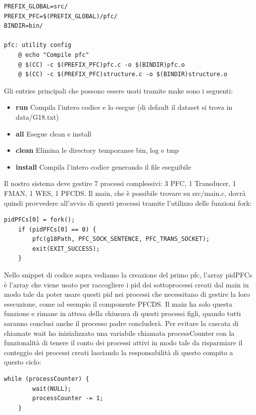 \documentclass{article}
\begin{document}
\begin{flushleft}
\begin{lstlisting}[frame=single]
PREFIX_GLOBAL=src/
PREFIX_PFC=$(PREFIX_GLOBAL)/pfc/
BINDIR=bin/

pfc: utility config 
	@ echo "Compile pfc"
	@ $(CC) -c $(PREFIX_PFC)pfc.c -o $(BINDIR)pfc.o
	@ $(CC) -c $(PREFIX_PFC)structure.c -o $(BINDIR)structure.o
\end{lstlisting}

Gli entries principali che possono essere usati tramite make sono i seguenti:

\begin{itemize}
    \item \textbf{run} Compila l'intero codice e lo esegue (di default il dataset si trova in data/G18.txt)
    \item \textbf{all} Esegue clean e install
    \item \textbf{clean} Elimina le directory temporanee bin, log e tmp
    \item \textbf{install} Compila l'intero codice generando il file eseguibile
\end{itemize}

Il nostro sistema deve gestire 7 processi complessivi: 3 PFC, 1 Transducer, 1 FMAN, 1 WES, 1 PFCDS. Il main, che è possibile trovare su src/main.c, dovrà quindi provvedere all'avvio di questi processi tramite l'utilizzo delle funzioni fork:

\begin{lstlisting}[frame=single]
    pidPFCs[0] = fork();
    if (pidPFCs[0] == 0) {
        pfc(g18Path, PFC_SOCK_SENTENCE, PFC_TRANS_SOCKET);
        exit(EXIT_SUCCESS);
    }
\end{lstlisting}

Nello snippet di codice sopra vediamo la creazione del primo pfc, l'array pidPFCs è l'array che viene usato per raccogliere i pid dei sottoprocessi creati dal main in modo tale da poter usare questi pid nei processi che necessitano di gestire la loro esecuzione, come ad esempio il componente PFCDS. Il main ha solo questa funzione e rimane in attesa della chiusura di questi processi figli, quando tutti saranno conclusi anche il processo padre concluderà. Per evitare la cascata di chiamate wait ho inizializzato una variabile chiamata processCounter con la funzionalità di tenere il conto dei processi attivi in modo tale da risparmiare il conteggio dei processi creati lasciando la responsabilità di questo compito a questo ciclo:

\begin{lstlisting}[frame=single]
    while (processCounter) {
        wait(NULL);
        processCounter -= 1;
    }
\end{lstlisting}


\end{flushleft}
\end{document}

